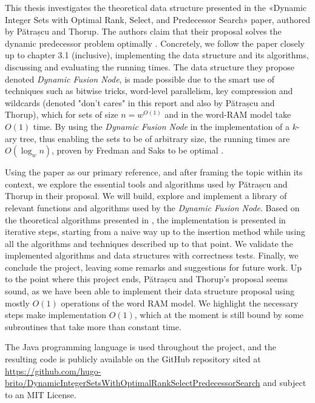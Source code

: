 
This thesis investigates the theoretical data structure presented in the «Dynamic Integer Sets with Optimal Rank, Select, and Predecessor Search» paper, authored by Pătrașcu and Thorup.
The authors claim that their proposal solves the dynamic predecessor problem optimally \cite{patrascu2014dynamic}.
Concretely, we follow the paper closely up to chapter 3.1 (inclusive), implementing the data structure and its algorithms, discussing and evaluating the running times.
The data structure they propose denoted \textit{Dynamic Fusion Node}, is made possible due to the smart use of techniques such as bitwise tricks, word-level parallelism, key compression and wildcards (denoted "don't cares" in this report and also by Pătrașcu and Thorup), which for sets of size $n = w^{O(1)}$ and in the word-RAM model take $O(1)$ time.
By using the \textit{Dynamic Fusion Node} in the implementation of a $k$-ary tree, thus enabling the sets to be of arbitrary size, the running times are $O(\log_w n)$, proven by Fredman and Saks to be optimal \cite{fredman1989cell}.

Using the \cite{patrascu2014dynamic} paper as our primary reference, and after framing the topic within its context, we explore the essential tools and algorithms used by Pătrașcu and Thorup in their proposal.
We will build, explore and implement a library of relevant functions and algorithms used by the \textit{Dynamic Fusion Node}.
Based on the theoretical algorithms presented in \cite{patrascu2014dynamic}, the implementation is presented in iterative steps, starting from a naive way up to the insertion method while using all the algorithms and techniques described up to that point.
We validate the implemented algorithms and data structures with correctness tests.
Finally, we conclude the project, leaving some remarks and suggestions for future work.
Up to the point where this project ends, Pătrașcu and Thorup's proposal seems sound, as we have been able to implement their data structure proposal using mostly $O(1)$ operations of the word RAM model.
We highlight the necessary steps make implementation $O(1)$, which at the moment is still bound by some subroutines that take more than constant time.

The Java programming language is used throughout the project, and the resulting code is publicly available on the GitHub repository sited at \url{https://github.com/hugo-brito/DynamicIntegerSetsWithOptimalRankSelectPredecessorSearch} and subject to an MIT License.

